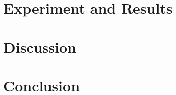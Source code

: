 \documentclass[conference,onecolumn]{IEEEtran}
\begin{document}
%        
%
%


\section{Experiment and Results}

\section{Discussion}


\section{Conclusion}
\end{document}
